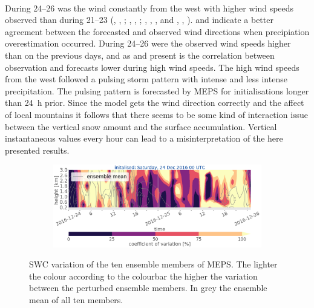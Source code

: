 \\
During \SIrange{24}{26}{\dec} was the wind constantly from the west with higher wind speeds observed than during \SIrange{21}{23}{\dec} (, , ; , , ; , , , and , , ).  and  indicate a better agreement between the forecasted and observed wind directions when precipiation overestimation occurred. During \SIrange{24}{26}{\dec} were the observed wind speeds higher than on the previous days, and as  and  present is the correlation between observation and forecasts lower during high wind speeds. The high wind speeds from the west followed a pulsing storm pattern with intense and less intense precipitation. The pulsing pattern is forecasted by MEPS for initialisations longer than \SI{24}{\hour} prior. Since the model gets the wind direction correctly and the affect of local mountains it follows that there seems to be some kind of interaction issue between the vertical snow amount and the surface accumulation. Vertical instantaneous values every hour can lead to a misinterpretation of the here presented results. 
\begin{figure}[t!]
	\centering
	\begin{subfigure}[b]{\textwidth}
		\includegraphics[trim={0cm 0cm 0cm 0cm},clip,width=\textwidth]{./fig_variation/20161224}
		\caption{}\label{fig:vari:EM24}
	\end{subfigure}
	\caption{SWC variation of the ten ensemble members of MEPS. The lighter the colour according to the colourbar the higher the variation between the perturbed ensemble members. In grey the ensemble mean of all ten members.}\label{fig:ens_vari24}
\end{figure}
